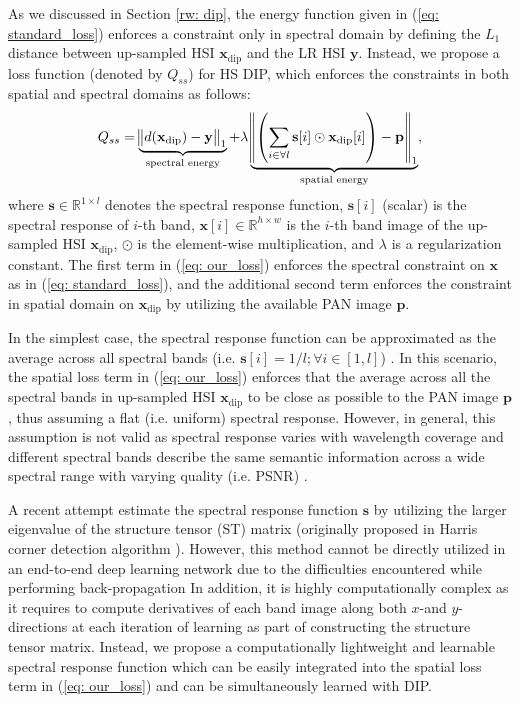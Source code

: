 \documentclass[journal]{IEEEtran}
\begin{document}
    As we discussed in Section \ref{rw: dip}, the energy function given in (\ref{eq: standard_loss}) enforces a constraint only in spectral domain by defining the $L_1$ distance between up-sampled HSI $\mathbf{x}_{\text{dip}}$ and the LR HSI $\mathbf{y}$. Instead, we propose a loss function (denoted by $Q_{ss}$) for HS DIP, which enforces the constraints in both spatial and spectral domains as follows:
    \begin{equation}
        Q_{ss} = \underbrace{\norm{d(\mathbf{x}_{\text{dip}})-\mathbf{y}}_1}_{\text{spectral energy}} + \lambda \underbrace{\norm{ \left( \sum_{i \in \forall l} \mathbf{s}[i] \odot \mathbf{x}_{\text{dip}}[i] \right) - \mathbf{p}}_1}_{\text{spatial energy}},
        \label{eq: our_loss}
    \end{equation}
    where $\mathbf{s} \in \mathbb{R}^{1 \times l}$ denotes the spectral response function,  $\mathbf{s}[i]$ (scalar) is the spectral response of $i$-th band, $\mathbf{x}[i] \in \mathbb{R}^{h \times w}$ is  the $i$-th band image of the up-sampled HSI $\mathbf{x}_{\text{dip}}$, $\odot$ is the element-wise multiplication, and $\lambda$ is a regularization constant. The first term in (\ref{eq: our_loss}) enforces the spectral constraint on $\mathbf{x}$ as in (\ref{eq: standard_loss}), and the additional second term enforces the constraint in spatial domain on $\mathbf{x}_{\text{dip}}$ by utilizing the available PAN image $\mathbf{p}$. 
    \par In the simplest case, the spectral response function can be approximated as the average across all spectral bands (i.e. $\mathbf{s}[i] = 1/l; \forall i \in [1,l]$) \cite{SpectralRes1, SpectralRes2}. In this scenario, the spatial loss term in (\ref{eq: our_loss}) enforces that the average across all the spectral bands in up-sampled HSI $\mathbf{x}_{\text{dip}}$ to be close as possible to the PAN image $\mathbf{p}$, thus assuming a flat (i.e. uniform) spectral response. However, in general, this assumption is not valid as spectral response varies with wavelength coverage and different spectral bands describe the same semantic information across a wide spectral range with varying quality (i.e. PSNR) \cite{SpectralResEigen}. 
    
    \par A recent attempt \cite{SpectralResEigen} estimate the spectral response function $\mathbf{s}$ by utilizing the larger eigenvalue of the structure tensor (ST) matrix  (originally proposed in Harris corner detection algorithm  \cite{harris1988combined}). However, this method cannot be directly utilized in an end-to-end deep learning network due to the difficulties encountered while performing  back-propagation  In addition, it is highly computationally complex as it requires to compute derivatives of each band image along both $x$-and $y$-directions at each iteration of learning as part of constructing the structure tensor matrix. Instead, we propose a computationally lightweight and learnable spectral response function which can be easily integrated into the spatial loss term in (\ref{eq: our_loss}) and can be simultaneously learned with DIP.
    
\end{document}
